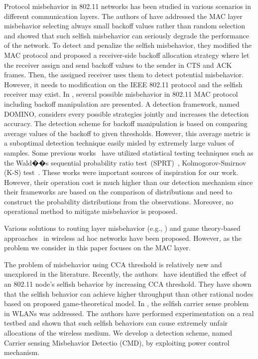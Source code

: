 Protocol misbehavior in 802.11 networks has been studied
in various scenarios in different communication layers.
The authors of \cite{Kysanur:Vaidya05} have addressed the MAC layer misbehavior
selecting always small backoff values rather than random selection
and showed that such selfish misbehavior
can seriously degrade the performance of the network. To detect and penalize
the selfish misbehavior, they modified the MAC protocol and proposed a
receiver-side backoff allocation strategy where let
the receiver assign and send backoff values to the sender in
CTS and ACK frames.
Then, the assigned receiver uses them to detect potential misbehavior.
However, it needs to modification on the IEEE
802.11 protocol and the selfish receiver may exist.
%
In \cite{Radosavac-Wise05},
several possible misbehavior in 802.11 MAC protocol including
backoff manipulation are presented.
A detection framework, named DOMINO, considers
every possible strategies jointly and increases the detection accuracy.
The detection scheme for backoff manipulation is based on comparing
average values of the backoff to given thresholds.
However, this average metric is a suboptimal detection technique easily
misled by extremely large values of samples.
Some previous works~\cite{Toledo:Wang07a, Radosavac-Wise05} have utilized
statistical testing techniques such as
the Wald��s sequential probability ratio test~(SPRT)~\cite{Radosavac-Wise05},
Kolmogorov-Smirnov (K-S) test~\cite{Toledo:Wang07a}.
These works were important sources of inspiration for our work.
However, their operation cost is much higher
than our detection mechanism since their frameworks are
based on the comparison of distributions and
need to construct the probability distributions from
the observations. Moreover, no operational method to mitigate misbehavior
is proposed.

Various solutions to routing layer misbehavior
(e.g., \cite{BenSalem03, Marti03})
and game theory-based approaches~\cite{MacKenzie01,Akella02} in wireless
ad hoc networks have been proposed. However, as the problem we
consider in this paper focuses on the MAC layer.


The problem of misbehavior using CCA threshold is relatively new
and unexplored in the literature.
Recently, the authors~\cite{yang:choi-LCN09} have identified the effect of an
802.11 node's selfish behavior by increasing CCA threshold.
They have shown that the selfish behavior can achieve
higher throughput than other rational nodes based on
proposed game-theoretical model.
In \cite{Pelechris:Krish-Infocom09}, the selfish carrier sense problem
in WLANs was addressed. The authors have performed experimentation
on a real testbed and shown that such selfish behaviors can
cause extremely unfair allocations of the wireless medium.
We develop a detection scheme, named Carrier
sensing Misbehavior Detectio (CMD),
by exploiting power control mechanism.



